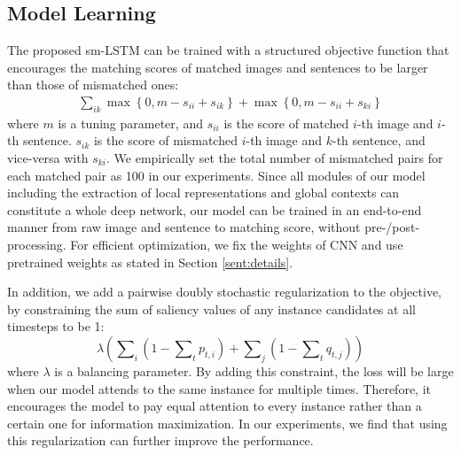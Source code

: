 \documentclass[10pt,twocolumn,letterpaper]{article}
\begin{document}
\subsection{Model Learning}

The proposed sm-LSTM can be trained with a structured objective function
that encourages the matching scores of matched images and sentences to be larger
than those of mismatched ones:
\begin{equation} \label{eqn:e5}
\begin{aligned}
\sum\nolimits_{ik}{{\max \left\{ {0,m - s_{ii}+ s_{ik}} \right\}}}  + {{\max \left\{ {0,m - s_{ii} + s_{ki}} \right\}} }
\end{aligned}
\end{equation}
where $m$ is a tuning parameter,
and $s_{ii}$ is the score of matched $i$-th image and $i$-th sentence.
$s_{ik}$ is the score of mismatched $i$-th image and $k$-th sentence,
and vice-versa with $s_{ki}$.
We empirically set the total number of mismatched pairs for each matched pair
as 100 in our experiments.
Since all modules of our model including the extraction of local representations
and global contexts can constitute a whole deep network,
our model can be trained in an end-to-end manner from raw image and sentence to matching score,
without pre-/post-processing.
For efficient optimization, we fix the weights of CNN and use pretrained weights
as stated in Section \ref{sent:details}.


In addition, we add a pairwise doubly stochastic regularization to the objective,
by constraining the sum of saliency values of any instance candidates at all timesteps to be 1:
\begin{equation} \label{eqn:e5}
\lambda \left( \sum\nolimits_{i} {( {1 - \sum\nolimits_{t} {{p_{t,i}}} } )}
+ \sum\nolimits_{j} {( {1 - \sum\nolimits_{t} {{q_{t,j}}} } )} \right)
\end{equation}
where $\lambda$ is a balancing parameter.
By adding this constraint, the loss will be large
when our model attends to the same instance for multiple times.
Therefore, it encourages the model to pay equal attention to
every instance rather than a certain one for information maximization.
In our experiments, we find that using this regularization can further improve the performance.
\end{document}
